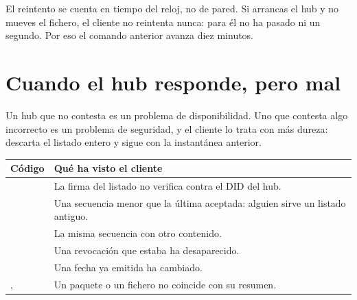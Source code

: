 \begin{trampaHabitual}
El reintento se cuenta en tiempo del reloj, no de pared. Si arrancas el hub y no mueves el fichero, el cliente
no reintenta nunca: para él no ha pasado ni un segundo. Por eso el comando anterior avanza diez minutos.
\end{trampaHabitual}

\begin{center}
\end{center}

\section{Cuando el hub responde, pero mal}

Un hub que no contesta es un problema de disponibilidad. Uno que contesta algo incorrecto es un problema de
seguridad, y el cliente lo trata con más dureza: descarta el listado entero y sigue con la instantánea anterior.

\noindent\begin{tabularx}{\linewidth}{@{}L{6.7cm}Y@{}}
\toprule
\textbf{Código} & \textbf{Qué ha visto el cliente} \\
\midrule
{} & La firma del listado no verifica contra el DID del hub. \\
 & Una secuencia menor que la última aceptada: alguien sirve un listado antiguo. \\
 & La misma secuencia con otro contenido. \\
 & Una revocación que estaba ha desaparecido. \\
 & Una fecha ya emitida ha cambiado. \\
,  & Un paquete o un fichero no coincide con su resumen. \\
\bottomrule
\end{tabularx}

